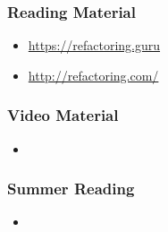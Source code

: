 \begin{frame}

\frametitle{Reading Material}

\footnotesize

\begin{itemize}

\item \url{https://refactoring.guru}

\item \url{http://refactoring.com/}

\end{itemize}

\end{frame}


\begin{frame}

\frametitle{Video Material}

\footnotesize

\begin{itemize}

\item

\end{itemize}

\end{frame}


\begin{frame}

\frametitle{Summer Reading}

\footnotesize

\begin{itemize}

\item

\end{itemize}

\end{frame}
